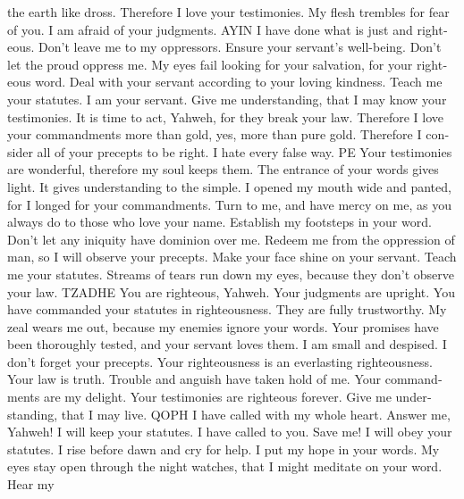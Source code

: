 \begin{paracol}{2}
\begin{otherlanguage}{english}
the earth like dross. Therefore I love your testimonies.
 My flesh trembles for fear of you. I am afraid of your
judgments. AYIN  I have done what is just and righteous.
Don't leave me to my oppressors.  Ensure your servant's
well-being. Don't let the proud oppress me.  My eyes
fail looking for your salvation, for your righteous word.
 Deal with your servant according to your loving
kindness. Teach me your statutes.  I am your servant.
Give me understanding, that I may know your testimonies.
 It is time to act, Yahweh, for they break your law.
 Therefore I love your commandments more than gold, yes,
more than pure gold.  Therefore I consider all of your
precepts to be right. I hate every false way. PE  Your
testimonies are wonderful, therefore my soul keeps them.
 The entrance of your words gives light. It gives
understanding to the simple.  I opened my mouth wide and
panted, for I longed for your commandments.  Turn to me,
and have mercy on me, as you always do to those who love your name.
 Establish my footsteps in your word. Don't let any
iniquity have dominion over me.  Redeem me from the
oppression of man, so I will observe your precepts. 
Make your face shine on your servant. Teach me your statutes.
 Streams of tears run down my eyes, because they don't
observe your law. TZADHE  You are righteous, Yahweh.
Your judgments are upright.  You have commanded your
statutes in righteousness. They are fully trustworthy. 
My zeal wears me out, because my enemies ignore your words.
 Your promises have been thoroughly tested, and your
servant loves them.  I am small and despised. I don't
forget your precepts.  Your righteousness is an
everlasting righteousness. Your law is truth.  Trouble
and anguish have taken hold of me. Your commandments are my delight.
 Your testimonies are righteous forever. Give me
understanding, that I may live. QOPH  I have called with
my whole heart. Answer me, Yahweh! I will keep your statutes.
 I have called to you. Save me! I will obey your
statutes.  I rise before dawn and cry for help. I put my
hope in your words.  My eyes stay open through the night
watches, that I might meditate on your word.  Hear my

\end{otherlanguage}
\end{paracol}
